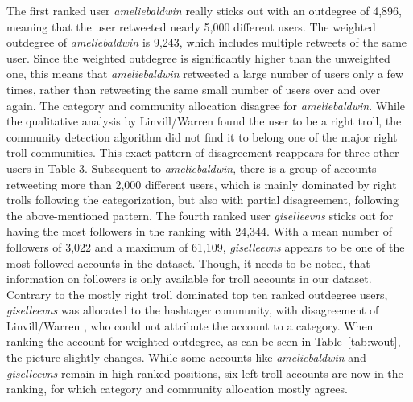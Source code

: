 \documentclass[12pt, titlepage=true, toc=bib]{scrartcl}
\begin{document}
The first ranked user \textit{ameliebaldwin} really sticks out with an outdegree of 4,896, meaning that the user retweeted nearly 5,000 different users. The weighted outdegree of \textit{ameliebaldwin} is 9,243, which includes multiple retweets of the same user. Since the weighted outdegree is significantly higher than the unweighted one, this means that \textit{ameliebaldwin} retweeted a large number of users only a few times, rather than retweeting the same small number of users over and over again. The category and community allocation disagree for \textit{ameliebaldwin}. While the qualitative analysis by Linvill/Warren \cite*{linvill_troll_2018} found the user to be a right troll, the community detection algorithm did not find it to belong one of the major right troll communities. This exact pattern of disagreement reappears for three other users in Table 3. Subsequent to \textit{ameliebaldwin}, there is a group of accounts retweeting more than 2,000 different users, which is mainly dominated by right trolls following the categorization, but also with partial disagreement, following the above-mentioned pattern. The fourth ranked user \textit{giselleevns} sticks out for having the most followers in the ranking with 24,344. With a mean number of followers of 3,022 and a maximum of 61,109, \textit{giselleevns} appears to be one of the most followed accounts in the dataset. Though, it needs to be noted, that information on followers is only available for troll accounts in our dataset. Contrary to the mostly right troll dominated top ten ranked outdegree users, \textit{giselleevns} was allocated to the hashtager community, with disagreement of Linvill/Warren \cite*{linvill_troll_2018}, who could not attribute the account to a category. When ranking the account for weighted outdegree, as can be seen in Table~\ref{tab:wout}, the picture slightly changes. While some accounts like \textit{ameliebaldwin} and \textit{giselleevns} remain in high-ranked positions, six left troll accounts are now in the ranking, for which category and community allocation mostly agrees.
\end{document}
